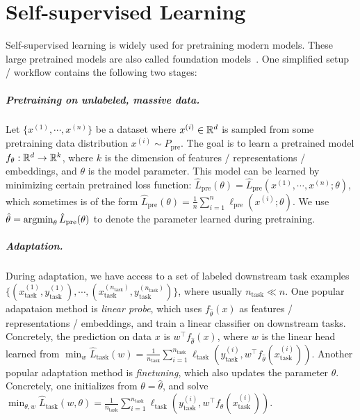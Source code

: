\chapter{Self-supervised Learning}

Self-supervised learning is widely used for pretraining modern models. These large pretrained models are also called foundation models~\cite{bommasani2021opportunities}. One simplified setup / workflow contains the following two stages:

\paragraph{Pretraining on unlabeled, massive data.} Let $\{x^{(1)}, \cdots, x^{(n)}\}$ be a dataset where $x^{(i)}\in\mathbb R^d$ is sampled from some pretraining data distribution $x^{(i)}\sim P_{\text{pre}}$. The goal is to learn a pretrained model $f_{\theta}: \mathbb R^d\rightarrow\mathbb R^k$, where $k$ is the dimension of features / representations / embeddings, and $\theta$ is the model parameter. This model can be learned by minimizing certain pretrained loss function: $\hat{L}_{\text{pre}}(\theta) = \hat{L}_{\text{pre}}(x^{(1)}, \cdots, x^{(n)}; \theta)$, which sometimes is of the form $\hat{L}_{\text{pre}}(\theta)  = \frac{1}{n}\sum_{i=1}^n \ell_{\text{pre}}(x^{(i)}; \theta)$. We use $\hat{\theta} = \operatorname*{\textup{argmin}}_{\theta}\hat{L}_{\text{pre}}(\theta)$ to denote the parameter learned during pretraining.

\paragraph{Adaptation.} During adaptation, we have access to a set of labeled downstream task examples $\{(x^{(1)}_{\text{task}}, y^{(1)}_{\text{task}}), \cdots, (x^{(n_{\text{task}})}_{\text{task}}, y^{(n_{\text{task}})}_{\text{task}})\}$, where usually $n_{\text{task}}\ll n$. One popular adapataion method is \emph{linear probe}, which uses $f_{\hat{\theta}}(x)$ as features / representations / embeddings, and train a linear classifier on downstream tasks. Concretely, the prediction on data $x$ is $w^\top f_{\hat{\theta}}(x)$, where $w$ is the linear head learned from $\min_{w} \hat{L}_{\text{task}}(w) = \frac{1}{n_{\text{task}}} \sum_{i=1}^{n_{\text{task}}} \ell_{\text{task}}(y^{(i)}_{\text{task}}, w^\top f_{\hat{\theta}}(x^{(i)}_{\text{task}}))$. Another popular adaptation method is \emph{finetuning}, which also updates the parameter $\theta$. Concretely, one initializes from $\theta = \hat{\theta}$, and solve $\min_{\theta, w} \hat{L}_{\text{task}}(w, \theta) = \frac{1}{n_{\text{task}}} \sum_{i=1}^{n_{\text{task}}} \ell_{\text{task}}(y^{(i)}_{\text{task}}, w^\top f_{{\theta}}(x^{(i)}_{\text{task}}))$.

